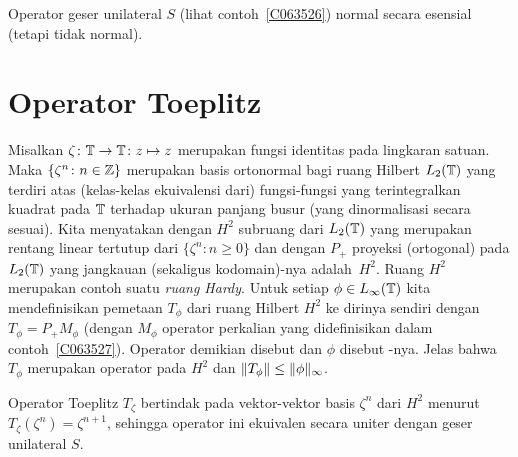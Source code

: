 \begin{exam} Operator geser unilateral $S$ (lihat contoh~\ref{C063526})
normal secara esensial (tetapi tidak normal).
\end{exam}





















\section{Operator Toeplitz}
\begin{defn} Misalkan
$\zeta\colon \mathbb{T} \rightarrow \mathbb{T}\colon z \mapsto z$ merupakan fungsi identitas pada lingkaran satuan.
Maka $\{\zeta^n\colon n \in \mathbb{Z}\}$ merupakan basis ortonormal bagi ruang Hilbert $L_2(\mathbb{T})$ yang terdiri atas
(kelas-kelas ekuivalensi dari) fungsi-fungsi yang terintegralkan kuadrat pada $\mathbb{T}$ terhadap ukuran panjang
busur (yang dinormalisasi secara sesuai). Kita menyatakan dengan $H^2$ subruang dari $L_2(\mathbb{T})$ yang merupakan
rentang linear tertutup dari $\{\zeta^n\colon n \ge 0\}$ dan dengan $P_+$ proyeksi
(ortogonal) pada $L_2(\mathbb{T})$ yang jangkauan
(sekaligus kodomain)-nya adalah~$H^2$. Ruang $H^2$ merupakan
contoh suatu
\emph{ruang Hardy}. Untuk setiap $\phi \in L_\infty(\mathbb{T})$ kita mendefinisikan pemetaan $T_\phi$ dari
ruang Hilbert $H^2$ ke dirinya sendiri dengan $T_\phi = P_+M_\phi$ (dengan $M_\phi$ operator
perkalian yang didefinisikan dalam contoh~\ref{C063527}). Operator demikian disebut
 dan $\phi$ disebut
-nya. Jelas bahwa $T_\phi$ merupakan operator pada $H^2$ dan $\lVert T_\phi\rVert \le \lVert\phi\rVert_\infty$.
\end{defn}

\begin{exam} Operator Toeplitz $T_\zeta$
bertindak pada vektor-vektor basis $\zeta^n$ dari $H^2$ menurut $T_\zeta(\zeta^n) = \zeta^{n+1}$, sehingga operator ini
ekuivalen secara uniter dengan geser unilateral $S$.
\end{exam}

